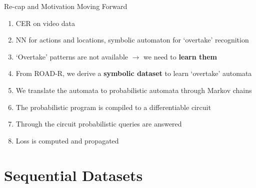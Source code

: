 \documentclass[10pt, aspectratio=169]{beamer}
\begin{document}
\begin{frame}{Re-cap and Motivation Moving Forward}
       \begin{enumerate}
        \setlength{\itemsep}{10pt}
        \item CER on video data
        \item NN for actions and locations, symbolic automaton for `overtake' recognition
        \item `Overtake' patterns are not available $\rightarrow$ we need to \textbf{learn them}
        \item From ROAD-R, we derive a \textbf{symbolic dataset} to learn `overtake' automata
        \item We translate the automata to probabilistic automata through Markov chains
        \item The probabilistic program is compiled to a differentiable circuit 
        \item Through the circuit probabilistic queries are answered
        \item Loss is computed and propagated
    \end{enumerate}
\end{frame}


\section{Sequential Datasets}
{
    \begin{frame}
        \sectionpage%
    \end{frame}
}
\end{document}
